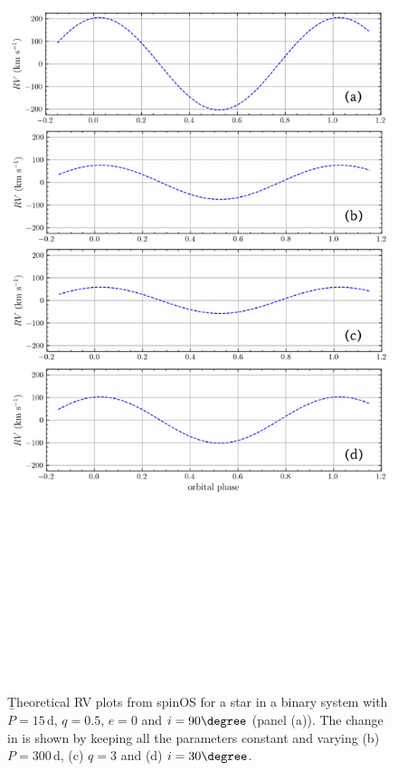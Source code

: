 \begin{figure}
    \centering
    \includegraphics[width=\hsize]{chapters/introduction/image/Thesis_RV.pdf}
    \caption{\b{Theoretical RV plots from spinOS \citep[][]{2021Fabry} for a star in a binary system with $P=15\,$d, $q=0.5$, $e=0$ and $i=90\degree$ (panel (a)). The change in \DelRV{} is shown by keeping all the parameters constant and varying (b) $P=300\,$d, (c) $q=3$ and (d) $i=30\degree$.} }
    \label{fig:rv_model}
\end{figure}

